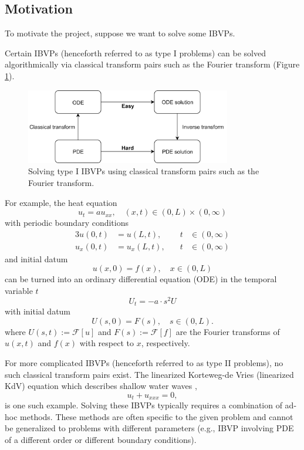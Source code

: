 \documentclass[12pt, oneside, a4paper]{article}
\begin{document}
\subsection{Motivation}\label{sec:motivation}
To motivate the project, suppose we want to solve some IBVPs.

Certain IBVPs (henceforth referred to as type I problems) can be solved algorithmically via classical transform pairs such as the Fourier transform (Figure \ref{fig:classical_transform}). 
\begin{figure}[htpb!]
    \centering
    \includegraphics[width=0.8\textwidth]{classical_transform.png}
    \caption{Solving type I IBVPs using classical transform pairs such as the Fourier transform.}
    \label{fig:classical_transform}
\end{figure}

\noindent For example, the heat equation \cite{Pinsky1991}
\[u_t = au_{xx},\quad (x,t)\in (0, L)\times (0,\infty)\]
with periodic boundary conditions
\begin{alignat*}{3}
    u(0, t) &= u(L, t),&\quad t&\in (0,\infty)\\
    u_x(0, t) &= u_x(L, t),&\quad t&\in (0,\infty)
\end{alignat*}
and initial datum
\[u(x,0) = f(x), \quad x\in (0, L)\]
can be turned into an ordinary differential equation (ODE) in the temporal variable $t$
\[U_t = -a\cdot s^2U\]
with initial datum
\[U(s,0) = F(s),\quad s\in (0,L).\]
where $U(s,t):=\mathcal{F}[u]$ and $F(s):=\mathcal{F}[f]$ are the Fourier transforms of $u(x,t)$ and $f(x)$ with respect to $x$, respectively. 


For more complicated IBVPs (henceforth referred to as type II problems), no such classical transform pairs exist. The linearized Korteweg-de Vries (linearized KdV) equation which describes shallow water waves \cite{Korteweg1895},
\begin{equation}\label{eq:linearied_kdv}
    u_t + u_{xxx} = 0,
\end{equation}
is one such example. Solving these IBVPs typically requires a combination of ad-hoc methods. These methods are often specific to the given problem and cannot be generalized to problems with different parameters (e.g., IBVP involving PDE of a different order or different boundary conditions). 
\end{document}

